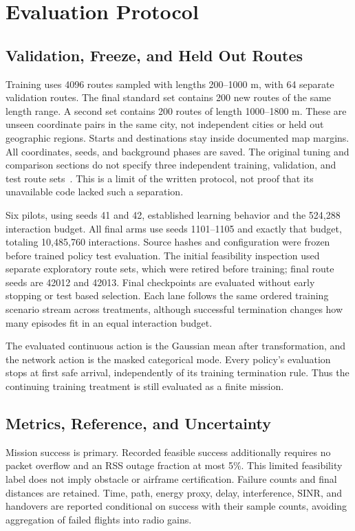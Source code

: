 \documentclass[conference]{IEEEtran}
\begin{document}
\section{Evaluation Protocol}
\subsection{Validation, Freeze, and Held Out Routes}
Training uses 4096 routes sampled with lengths 200--1000 m, with 64 separate
validation routes. The final standard set contains 200 new routes of the same
length range. A second set contains 200 routes of length 1000--1800 m. These
are unseen coordinate pairs in the same city, not independent cities or held
out geographic regions. Starts and destinations stay inside documented map
margins. All coordinates, seeds, and background phases are saved.
The original tuning and comparison sections do not specify three independent
training, validation, and test route sets~\cite[pp.~15--16, Secs.~6.2--6.3]{thesis}.
This is a limit of the written protocol, not proof that its unavailable code
lacked such a separation.

Six pilots, using seeds 41 and 42, established learning behavior and the
524,288 interaction budget. All final arms use seeds 1101--1105 and exactly
that budget, totaling 10,485,760 interactions. Source hashes and configuration
were frozen before trained policy test evaluation. The initial feasibility
inspection used separate exploratory route sets, which were retired before
training; final route seeds are 42012 and 42013. Final checkpoints are evaluated
without early stopping or test based selection. Each lane follows the same
ordered training scenario stream across treatments, although successful
termination changes how many episodes fit in an equal interaction budget.

The evaluated continuous action is the Gaussian mean after transformation, and
the network action is the masked categorical mode. Every policy's evaluation
stops at first safe arrival, independently of its training termination rule.
Thus the continuing training treatment is still evaluated as a finite mission.

\subsection{Metrics, Reference, and Uncertainty}
Mission success is primary. Recorded feasible success additionally requires
no packet overflow and an RSS outage fraction at most 5\%. This limited
feasibility label does not imply obstacle or airframe certification. Failure
counts and final distances are retained. Time, path, energy proxy, delay,
interference, SINR, and handovers are reported conditional on success with
their sample counts, avoiding aggregation of failed flights into radio gains.
\end{document}
